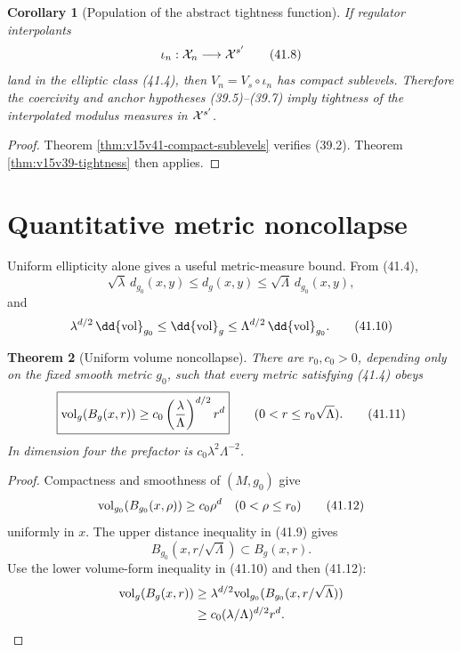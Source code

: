 \documentclass[11pt]{article}
\newtheorem{theorem}{Theorem}[section]
\newtheorem{corollary}[theorem]{Corollary}
\theoremstyle{remark}
\begin{document}
\begin{corollary}[Population of the abstract tightness function]
\label{cor:v15v41-populate-v39}
If regulator interpolants
\[
 \iota_n:{\cal X}_n\longrightarrow{\cal X}^{s'}         \tag{41.8}
\]
land in the elliptic class (41.4), then
\(V_n=V_s\circ\iota_n\) has compact sublevels.  Therefore the
coercivity and anchor hypotheses (39.5)--(39.7) imply tightness of
the interpolated modulus measures in \({\cal X}^{s'}\).
\end{corollary}

\begin{proof}
Theorem \ref{thm:v15v41-compact-sublevels} verifies (39.2).
Theorem \ref{thm:v15v39-tightness} then applies.
\end{proof}

\section{Quantitative metric noncollapse}

Uniform ellipticity alone gives a useful metric-measure bound.  From
(41.4),
\[
 \sqrt\lambda\,d_{g_0}(x,y)
 \leq d_g(x,y)
 \leq\sqrt\Lambda\,d_{g_0}(x,y),                        \tag{41.9}
\]
and
\[
 \lambda^{d/2}\,\dd{\rm vol}_{g_0}
 \leq\dd{\rm vol}_g
 \leq\Lambda^{d/2}\,\dd{\rm vol}_{g_0}.                 \tag{41.10}
\]

\begin{theorem}[Uniform volume noncollapse]
\label{thm:v15v41-noncollapse}
There are \(r_0,c_0>0\), depending only on the fixed smooth metric
\(g_0\), such that every metric satisfying (41.4) obeys
\[
 \boxed{
 {\rm vol}_g(B_g(x,r))
 \geq
 c_0\left(\frac{\lambda}{\Lambda}\right)^{d/2}r^d}
 \qquad(0<r\leq r_0\sqrt\Lambda).                       \tag{41.11}
\]
In dimension four the prefactor is
\(c_0\lambda^2\Lambda^{-2}\).
\end{theorem}

\begin{proof}
Compactness and smoothness of \((M,g_0)\) give
\[
 {\rm vol}_{g_0}(B_{g_0}(x,\rho))\geq c_0\rho^d
 \quad(0<\rho\leq r_0)                                  \tag{41.12}
\]
uniformly in \(x\).  The upper distance inequality in (41.9) gives
\[
 B_{g_0}(x,r/\sqrt\Lambda)\subset B_g(x,r).
\]
Use the lower volume-form inequality in (41.10) and then (41.12):
\[
 \begin{split}
 {\rm vol}_g(B_g(x,r))
 &\geq\lambda^{d/2}
 {\rm vol}_{g_0}(B_{g_0}(x,r/\sqrt\Lambda))\\
 &\geq c_0(\lambda/\Lambda)^{d/2}r^d.
 \end{split}
\]
\end{proof}
\end{document}
